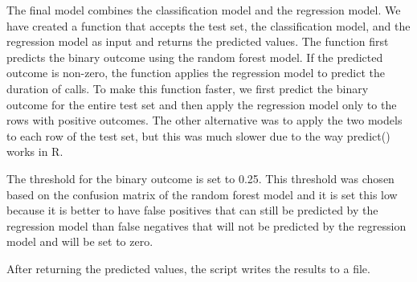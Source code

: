 \documentclass[
]{article}
\begin{document}
The final model combines the classification model and the regression
model. We have created a function that accepts the test set, the
classification model, and the regression model as input and returns the
predicted values. The function first predicts the binary outcome using
the random forest model. If the predicted outcome is non-zero, the
function applies the regression model to predict the duration of calls.
To make this function faster, we first predict the binary outcome for
the entire test set and then apply the regression model only to the rows
with positive outcomes. The other alternative was to apply the two
models to each row of the test set, but this was much slower due to the
way predict() works in R.

The threshold for the binary outcome is set to 0.25. This threshold was
chosen based on the confusion matrix of the random forest model and it
is set this low because it is better to have false positives that can
still be predicted by the regression model than false negatives that
will not be predicted by the regression model and will be set to zero.

After returning the predicted values, the script writes the results to a
file.
\end{document}
